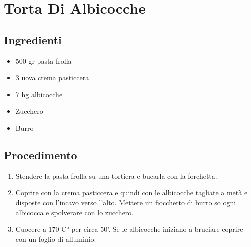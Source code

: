 \section{Torta Di Albicocche}
\subsection{Ingredienti}
\begin{itemize}
\item 500 gr pasta frolla  
\item 3 uova crema pasticcera  
\item 7 hg albicocche  
\item Zucchero  
\item Burro
\end{itemize}
\subsection{Procedimento}
\begin{enumerate}
\item  Stendere la pasta frolla su una tortiera e bucarla con la forchetta.  
\item  Coprire con la crema pasticcera e quindi con le albicocche tagliate a metà e disposte con l'incavo verso l'alto. Mettere un fiocchetto di burro so ogni albicocca e spolverare con lo zucchero.   
\item  Cuocere a 170 C° per circa 50'. Se le albicocche iniziano a bruciare coprire con un foglio di alluminio.
\end{enumerate}
